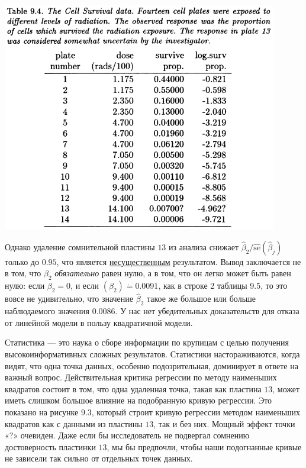 \documentclass{report}
\begin{document}
\noindent\includegraphics[width=12cm]{tab94}

Однако удаление сомнительной пластины $13$ из анализа снижает $\hat{\beta}_2/\hat{\text{se}}(\hat{\beta}_j)$ только до $0.95$, что является \underline{несущественным} результатом. Вывод заключается не в том, что $\beta_2$ \textit{обязательно} равен нулю, а в том, что он легко может быть равен нулю: если $\beta_2 = 0$, и если $(\beta_2) \dot = 0.0091$, как в строке 2 таблицы 9.5, то это вовсе не удивительно, что значение $\hat{\beta}_2$ такое же большое или больше наблюдаемого значения $0.0086$. У нас нет убедительных доказательств для отказа от линейной модели в пользу квадратичной модели.
							
Статистика --- это наука о сборе информации по крупицам с целью получения высокоинформативных сложных результатов. Статистики настораживаются, когда видят, что одна точка данных, особенно подозрительная, доминирует в ответе на важный вопрос. Действительная критика регрессии по методу наименьших квадратов состоит в том, что одна удаленная точка, такая как пластина $13$, может иметь слишком большое влияние на подобранную кривую регрессии. Это показано на рисунке 9.3, который строит кривую регрессии методом наименьших квадратов как с данными из пластины $13$, так и без них. Мощный эффект точки «?» очевиден. Даже если бы исследователь не подвергал сомнению достоверность пластинки $13$, мы бы предпочли, чтобы наши подогнанные кривые не зависели так сильно от отдельных точек данных.\\
\end{document}
